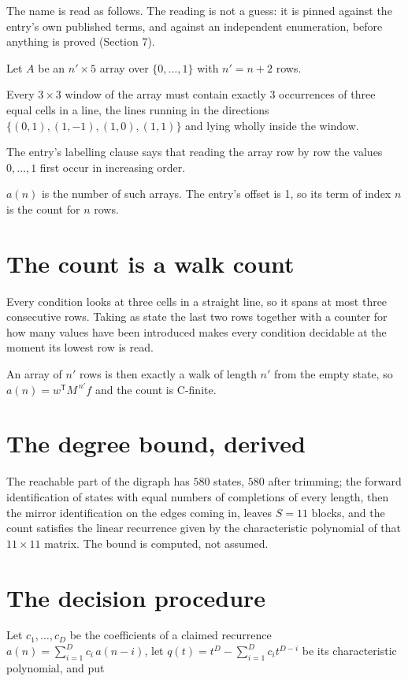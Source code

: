 \documentclass[11pt]{article}
\theoremstyle{definition}
\begin{document}
The name is read as follows. The reading is not a guess: it is pinned against the entry's own published terms, and against an independent enumeration, before anything is proved (Section 7).

Let $A$ be an $n' \times 5$ array over $\{0,\dots,1\}$ with $n' = n + 2$ rows.

Every $3\times3$ window of the array must contain exactly $3$ occurrences of three equal cells in a line, the lines running in the directions $\{(0,1), (1,-1), (1,0), (1,1)\}$ and lying wholly inside the window.

The entry's labelling clause says that reading the array row by row the values $0,\dots,1$ first occur in increasing order.

$a(n)$ is the number of such arrays. The entry's offset is 1, so its term of index $n$ is the count for $n$ rows.

\section{The count is a walk count}

Every condition looks at three cells in a straight line, so it spans at most three consecutive rows. Taking as state the last two rows together with a counter for how many values have been introduced makes every condition decidable at the moment its lowest row is read.

An array of $n'$ rows is then exactly a walk of length $n'$ from the empty state, so $a(n) = w^{\mathsf T}M^{\,n'}f$ and the count is C-finite.

\section{The degree bound, derived}

The reachable part of the digraph has $580$ states, $580$ after trimming; the forward identification of states with equal numbers of completions of every length, then the mirror identification on the edges coming in, leaves $S = 11$ blocks, and the count satisfies the linear recurrence given by the characteristic polynomial of that $11\times11$ matrix. The bound is computed, not assumed.

\section{The decision procedure}

Let $c_1,\dots,c_D$ be the coefficients of a claimed recurrence $a(n) = \sum_{i=1}^{D} c_i\,a(n-i)$, let $q(t) = t^{D} - \sum_{i=1}^{D} c_i t^{D-i}$ be its characteristic polynomial, and put
\end{document}
